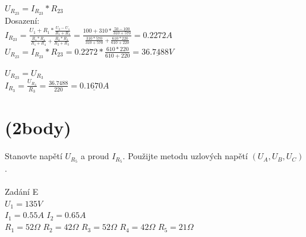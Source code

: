 \documentclass{article}
\begin{document}
\begin{large}
    $U_{R_{23}}=I_{R_{23}}*R_{23}$\\
    \newpage
    Dosazení:\\
    
    $I_{R_{23}}=\frac{U_1+R_1*\frac{U_2-U_1}{R_1+R_4}}{\frac{R_1*R_4}{R_1+R_4}+\frac{R_2*R_3}{R_2+R_3}}=\frac{100+310*\frac{50-100}{310+570}}{\frac{310*570}{310+570}+\frac{610*220}{610+220}}=0.2272A$\\
    
   
    
    $U_{R_{23}}=I_{R_{23}}*R_{23}=0.2272*\frac{610*220}{610+220}=\underline{36.7488V}$
    
    \underline{$U_{R_{23}}=U_{R_3}$}\\
    
    $I_{R_3}=\frac{U_{R_3}}{R_3}=\frac{36.7488}{220}=\underline{0.1670A}$
    
    


\newpage

\section{(2body)}


    Stanovte napětí $U_{R_5}$ a proud $I_{R_5}$. Použijte metodu uzlových napětí $(U_A, U_B, U_C)$.\\~\\
    Zadání E\\
    $U_1=135V$\\
    $I_1=0.55A$
    $I_2=0.65A$\\
    $R_1=52\Omega$
    $R_2=42\Omega$
    $R_3=52\Omega$
    $R_4=42\Omega$
    $R_5=21\Omega$



\end{large}
\end{document}
